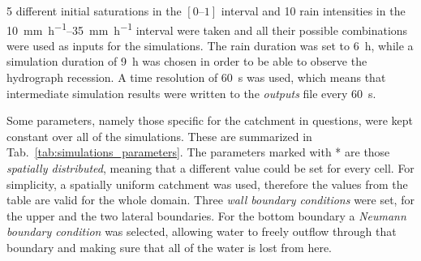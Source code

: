 \num{5} different initial saturations in the $[\numrange{0}{1}]$ interval and \num{10} rain intensities in the \SIrange{10}{35}{\milli\metre\per\hour} interval were taken and all their possible combinations were used as inputs for the simulations.
The rain duration was set to \SI{6}{\hour}, while a simulation duration of \SI{9}{\hour} was chosen in order to be able to observe the hydrograph recession. A time resolution of \SI{60}{\second} was used, which means that intermediate simulation results were written to the \emph{outputs} file every \SI{60}{\second}.

Some parameters, namely those specific for the catchment in questions, were kept constant over all of the simulations.
These are summarized in Tab.~\ref{tab:simulations_parameters}.
The parameters marked with * are those \emph{spatially distributed}, meaning that a different value could be set for every cell.
For simplicity, a spatially uniform catchment was used, therefore the values from the table are valid for the whole domain.
Three \textit{wall boundary conditions} were set, for the upper and the two lateral boundaries.
For the bottom boundary a \textit{Neumann boundary condition} was selected, allowing water to freely outflow through that boundary and making sure that all of the water is lost from here.

